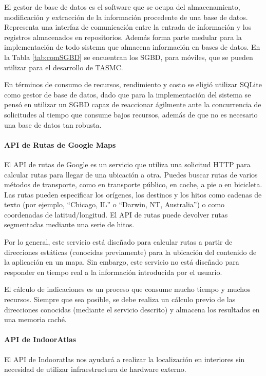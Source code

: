\newpage
El gestor de base de datos es el software que se ocupa del almacenamiento, modificación y extracción de la información procedente de una base de datos. Representa una interfaz de comunicación entre la entrada de información y los registros almacenados en repositorios. Además forma parte medular para la implementación de todo sistema que almacena información en bases de datos. En la Tabla \ref{tab:comSGBD} se encuentran los SGBD, para móviles, que se pueden utilizar para el desarrollo de TASMC.

En términos de consumo de recursos, rendimiento y costo se eligió utilizar SQLite como gestor de base de datos, dado que para la implementación del sistema se pensó en utilizar un SGBD capaz de reaccionar ágilmente ante la concurrencia de solicitudes al tiempo que consume bajos recursos, además de que no es necesario una base de datos tan robusta.

\paragraph{API de Rutas de Google Maps}

El API de rutas de Google es un servicio que utiliza una solicitud HTTP para calcular rutas para llegar de una ubicación a otra. Puedes buscar rutas de varios métodos de transporte, como en transporte público, en coche, a pie o en bicicleta. Las rutas pueden especificar los orígenes, los destinos y los hitos como cadenas de texto (por ejemplo, ``Chicago, IL'' o ``Darwin, NT, Australia'') o como coordenadas de latitud/longitud. El API de rutas puede devolver rutas segmentadas mediante una serie de hitos.

Por lo general, este servicio está diseñado para calcular rutas a partir de direcciones estáticas (conocidas previamente) para la ubicación del contenido de la aplicación en un mapa. Sin embargo, este servicio no está diseñado para responder en tiempo real a la información introducida por el usuario.

El cálculo de indicaciones es un proceso que consume mucho tiempo y muchos recursos. Siempre que sea posible, se debe realiza un cálculo previo de las direcciones conocidas (mediante el servicio descrito) y almacena los resultados en una memoria caché. \cite{apiGoogleMaps}
\newpage
\paragraph{API de IndoorAtlas}

El API de Indooratlas nos ayudará a realizar la localización en interiores sin necesidad de utilizar infraestructura de hardware externo. \cite{apiIndoorAtlas}

